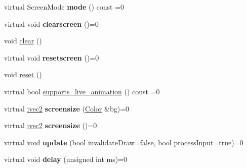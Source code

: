 \begin{DoxyCompactItemize}
\item 
\mbox{\label{classcturtle_1_1AbstractTurtleScreen_a6f4031d934f2785165b382384611b19d}} 
virtual Screen\+Mode {\bfseries mode} () const =0
\item 
\mbox{\label{classcturtle_1_1AbstractTurtleScreen_ad37d1976302819c74e766290a2128072}} 
virtual void {\bfseries clearscreen} ()=0
\item 
void \hyperlink{classcturtle_1_1AbstractTurtleScreen_abae240a2ba949c1628bb01ad850fb32b}{clear} ()
\item 
\mbox{\label{classcturtle_1_1AbstractTurtleScreen_a2a705428bc1fd07300ebcf1a6b10e989}} 
virtual void {\bfseries resetscreen} ()=0
\item 
void \hyperlink{classcturtle_1_1AbstractTurtleScreen_ac791e1eca792e71c356006c96eb98788}{reset} ()
\item 
virtual bool \hyperlink{classcturtle_1_1AbstractTurtleScreen_aa9651fa98eefdb83fd99d476217b5414}{supports\+\_\+live\+\_\+animation} () const =0
\item 
\mbox{\label{classcturtle_1_1AbstractTurtleScreen_a67b23a8833900072eb9079b836b1796e}} 
virtual \hyperlink{structcturtle_1_1ivec2}{ivec2} {\bfseries screensize} (\hyperlink{classcturtle_1_1Color}{Color} \&bg)=0
\item 
\mbox{\label{classcturtle_1_1AbstractTurtleScreen_a9e8443b41b8d0765993b1b6fb5cfb94f}} 
virtual \hyperlink{structcturtle_1_1ivec2}{ivec2} {\bfseries screensize} ()=0
\item 
\mbox{\label{classcturtle_1_1AbstractTurtleScreen_a85ab4fad60333c90051219e32a299686}} 
virtual void {\bfseries update} (bool invalidate\+Draw=false, bool process\+Input=true)=0
\item 
\mbox{\label{classcturtle_1_1AbstractTurtleScreen_a779ca47025b1d005ab0dcc5a0c368ac8}} 
virtual void {\bfseries delay} (unsigned int ms)=0
\item 
\mbox{\label{classcturtle_1_1AbstractTurtleScreen_ab1d6569b39973c6df6507e4f9890407e}} 

\end{DoxyCompactItemize}
